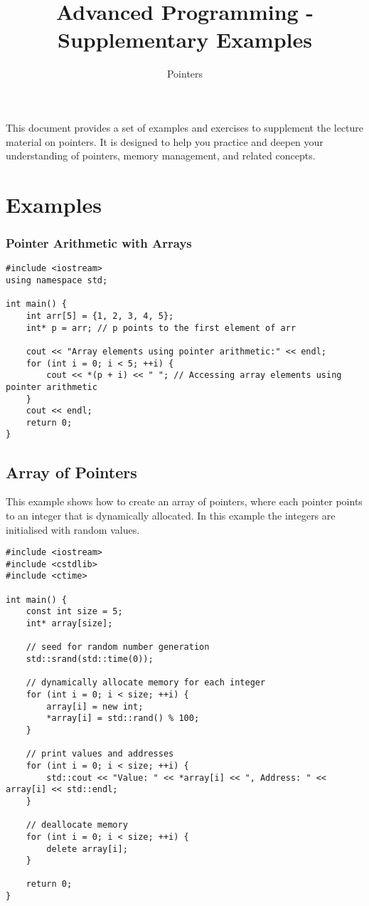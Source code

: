 \documentclass{article}
\title{Advanced Programming - Supplementary Examples}
\author{Pointers}
\date{}
\begin{document}
\maketitle

This document provides a set of examples and exercises to supplement the lecture material on pointers. It is designed to help you practice and deepen your understanding of pointers, memory management, and related concepts.

\section{Examples}

\subsubsection*{Pointer Arithmetic with Arrays}

\begin{verbatim}
#include <iostream>
using namespace std;

int main() {
    int arr[5] = {1, 2, 3, 4, 5};
    int* p = arr; // p points to the first element of arr

    cout << "Array elements using pointer arithmetic:" << endl;
    for (int i = 0; i < 5; ++i) {
        cout << *(p + i) << " "; // Accessing array elements using pointer arithmetic
    }
    cout << endl;
    return 0;
}
\end{verbatim}

\subsection*{Array of Pointers}
This example shows how to create an array of pointers, where each pointer points to an integer that is dynamically allocated. In this example the integers are initialised with random values.

\begin{verbatim}
#include <iostream>
#include <cstdlib>
#include <ctime>

int main() {
    const int size = 5;
    int* array[size];

    // seed for random number generation
    std::srand(std::time(0));

    // dynamically allocate memory for each integer
    for (int i = 0; i < size; ++i) {
        array[i] = new int;
        *array[i] = std::rand() % 100;
    }

    // print values and addresses
    for (int i = 0; i < size; ++i) {
        std::cout << "Value: " << *array[i] << ", Address: " << array[i] << std::endl;
    }

    // deallocate memory
    for (int i = 0; i < size; ++i) {
        delete array[i];
    }

    return 0;
}
\end{verbatim}
\end{document}

